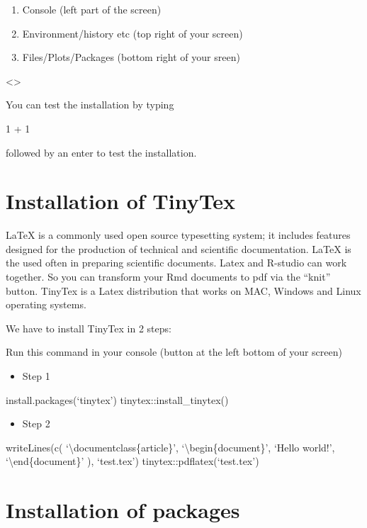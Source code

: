 \documentclass[
]{book}
\providecommand{\tightlist}{%
  \setlength{\itemsep}{0pt}\setlength{\parskip}{0pt}}
\begin{document}
\begin{enumerate}
\def\labelenumi{\arabic{enumi}.}
\tightlist
\item
  Console (left part of the screen)
\item
  Environment/history etc (top right of your screen)
\item
  Files/Plots/Packages (bottom right of your sreen)
\end{enumerate}

\textless{}\textgreater{}

You can test the installation by typing

1 + 1

followed by an enter to test the installation.

\hypertarget{installation-of-tinytex}{%
\section{Installation of TinyTex}\label{installation-of-tinytex}}

LaTeX is a commonly used open source typesetting system; it includes features designed for the production of technical and scientific documentation. LaTeX is the used often in preparing scientific documents.
Latex and R-studio can work together. So you can transform your Rmd documents to pdf via the ``knit'' button.
TinyTex is a Latex distribution that works on MAC, Windows and Linux operating systems.

We have to install TinyTex in 2 steps:

Run this command in your console (button at the left bottom of your screen)

\begin{itemize}
\tightlist
\item
  Step 1
\end{itemize}

install.packages(`tinytex')
tinytex::install\_tinytex()

\begin{itemize}
\tightlist
\item
  Step 2
\end{itemize}

writeLines(c(
`\textbackslash documentclass\{article\}',
`\textbackslash begin\{document\}', `Hello world!', `\textbackslash end\{document\}'
), `test.tex')
tinytex::pdflatex(`test.tex')

\hypertarget{installation-of-packages}{%
\section{Installation of packages}\label{installation-of-packages}}
\end{document}
